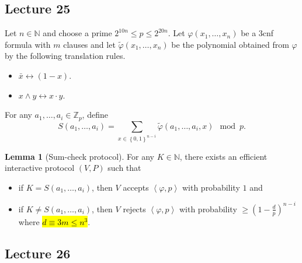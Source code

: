 \documentclass[10pt,letterpaper,cm]{nupset}
\theoremstyle{definition}
\theoremstyle{theorem}
\newtheorem{lemma}[definition]{Lemma}
\theoremstyle{remark}
\newcommand{\N}{\mathbb N}
\newcommand{\Z}{\mathbb Z}
\newcommand{\1}{\mathbf{1}}
\newcommand{\0}{\vec 0}
\begin{document}
\subsection{Lecture 25}

Let $n\in \N$ and choose a prime $2^{10n}\leq p\leq 2^{20n}$. Let  $\varphi(x_1, \ldots, x_n)$ be a 3cnf formula with $m$ clauses and let $\tilde{\varphi}(x_1, \ldots, x_n)$ be the polynomial obtained from $\varphi$ by the following translation rules.
\begin{itemize}
\item $\bar{x} \longleftrightarrow \left(1-x\right)$.
\item $x \land y \longleftrightarrow x \cdot y$.
\end{itemize} 
For any $a_1, \ldots, a_i \in \Z_p$, define $$S(a_1, \ldots, a_i) = \sum_{x\in \left\{0,1\right\}^{n-i}} \tilde{\varphi}(a_1, \ldots, a_i, x) \mod p.$$ 

\begin{lemma}[Sum-check protocol]\label{SCP}
For any $K\in \N$, there exists an efficient interactive protocol $\left(V, P\right)$ such that 
\begin{itemize}
\item if $K =S(a_1, \ldots, a_i)$, then $V$ accepts $\left\langle \varphi, p \right\rangle$ with probability $1$ and
\item if $K \ne S(a_1, \ldots, a_i)$, then $V$ rejects $\left\langle \varphi, p \right\rangle$ with probability $\geq \left(1-\frac{d}{p}\right)^{n-i}$ where \hl{$d \equiv 3m\leq n^3$}.
\end{itemize}
\end{lemma}


\subsection{Lecture 26}
\end{document}
